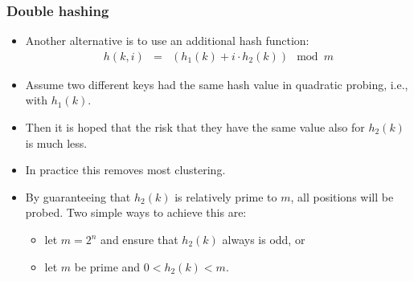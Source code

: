 \documentclass[trans]{beamer}
\begin{document}
\begin{frame}[fragile=singleslide]
\frametitle{Double hashing}
\begin{itemize}

\item
Another alternative is to use an additional hash function:
\[
\begin{array}{ccc}
h(k, i) &=& (h_1(k) + i\cdot h_2(k)) \mod m
\end{array}
\]
\item
Assume two different keys had the same hash value in quadratic probing, i.e., with $h_1(k)$.
\item Then it is hoped that the risk that they have the same value also for $h_2(k)$ is much less.
\item In practice this removes most clustering.
\item
By guaranteeing that $h_2(k)$ is relatively prime to $m$, all positions will be probed. Two simple ways
to achieve this are:
\begin{itemize}
\item let $m = 2^n$ and ensure that $h_2(k)$ always is odd, or
\item let $m$ be prime and $0 < h_2(k) < m$.
\end{itemize}
\end{itemize}
\end{frame}
\end{document}
